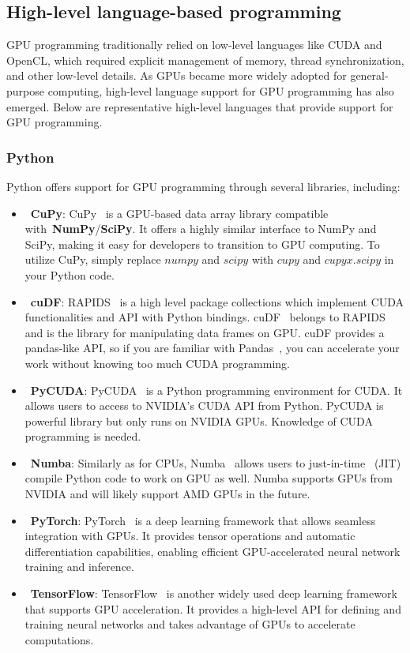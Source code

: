 

\subsection{High-level language-based programming}


\par
GPU programming traditionally relied on low-level languages like CUDA and OpenCL, which required explicit management of memory, thread synchronization, and other low-level details.
As GPUs became more widely adopted for general-purpose computing, high-level language support for GPU programming has also emerged.
Below are representative high-level languages that provide support for GPU programming.


\subsubsection{Python}

\par
Python offers support for GPU programming through several libraries, including:
\begin{itemize}
    \item~\textbf{CuPy}: CuPy~\cite{cupy} is a GPU-based data array library compatible with~\textbf{NumPy}/\textbf{SciPy}. It offers a highly similar interface to NumPy and SciPy, making it easy for developers to transition to GPU computing. To utilize CuPy, simply replace $numpy$ and $scipy$ with $cupy$ and $cupyx.scipy$ in your Python code.
    \item~\textbf{cuDF}: RAPIDS~\cite{rapids} is a high level package collections which implement CUDA functionalities and API with Python bindings. cuDF~\cite{cudf} belongs to RAPIDS and is the library for manipulating data frames on GPU. cuDF provides a pandas-like API, so if you are familiar with Pandas~\cite{pandas}, you can accelerate your work without knowing too much CUDA programming.
    \item~\textbf{PyCUDA}: PyCUDA~\cite{pycuda} is a Python programming environment for CUDA. It allows users to access to NVIDIA’s CUDA API from Python. PyCUDA is powerful library but only runs on NVIDIA GPUs. Knowledge of CUDA programming is needed.
    \item~\textbf{Numba}: Similarly as for CPUs, Numba~\cite{numba} allows users to just-in-time~\cite{jit} (JIT) compile Python code to work on GPU as well. Numba supports GPUs from NVIDIA and will likely support AMD GPUs in the future.
    \item~\textbf{PyTorch}: PyTorch~\cite{pytorch} is a deep learning framework that allows seamless integration with GPUs. It provides tensor operations and automatic differentiation capabilities, enabling efficient GPU-accelerated neural network training and inference.
    \item~\textbf{TensorFlow}: TensorFlow~\cite{tensorflow} is another widely used deep learning framework that supports GPU acceleration. It provides a high-level API for defining and training neural networks and takes advantage of GPUs to accelerate computations.
\end{itemize}


